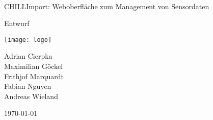 \documentclass[a4paper, 12pt, titlepage]{article}
\begin{document}
\begin{titlepage}
	\centering
	{\ \vspace{1.5cm}\\ \LARGE CHILLImport: Weboberfläche zum Management von Sensordaten \par}
	\vspace{2cm}
	{\Large Entwurf\par}
	\vspace{2.5cm}
	\texttt{[image: logo]}\par\vspace{4cm}
	{\large Adrian Cierpka \\
Maximilian Göckel \\
Frithjof Marquardt \\
Fabian Nguyen \\
Andreas Wieland\par}
	\vfill

	{\large \today\par}
\end{titlepage}

\tableofcontents
\clearpage
{} 


%

%






%

%
\end{document}
